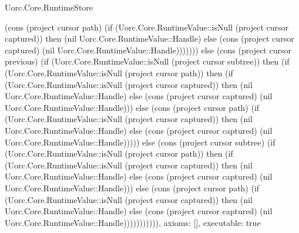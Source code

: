 \begin{lexlean}{Uorc.Core.RuntimeStore}
\begin{semanticmodule}
{(cons (project cursor path) (if (Uorc.Core.RuntimeValue::isNull (project cursor captured)) then (nil Uorc.Core.RuntimeValue::Handle) else (cons (project cursor captured) (nil Uorc.Core.RuntimeValue::Handle))))))) else (cons (project cursor previous) (if (Uorc.Core.RuntimeValue::isNull (project cursor subtree)) then (if (Uorc.Core.RuntimeValue::isNull (project cursor path)) then (if (Uorc.Core.RuntimeValue::isNull (project cursor captured)) then (nil Uorc.Core.RuntimeValue::Handle) else (cons (project cursor captured) (nil Uorc.Core.RuntimeValue::Handle))) else (cons (project cursor path) (if (Uorc.Core.RuntimeValue::isNull (project cursor captured)) then (nil Uorc.Core.RuntimeValue::Handle) else (cons (project cursor captured) (nil Uorc.Core.RuntimeValue::Handle))))) else (cons (project cursor subtree) (if (Uorc.Core.RuntimeValue::isNull (project cursor path)) then (if (Uorc.Core.RuntimeValue::isNull (project cursor captured)) then (nil Uorc.Core.RuntimeValue::Handle) else (cons (project cursor captured) (nil Uorc.Core.RuntimeValue::Handle))) else (cons (project cursor path) (if (Uorc.Core.RuntimeValue::isNull (project cursor captured)) then (nil Uorc.Core.RuntimeValue::Handle) else (cons (project cursor captured) (nil Uorc.Core.RuntimeValue::Handle))))))))))),
  axioms: [],
  executable: true
}
\end{semanticmodule}

\end{lexlean}
